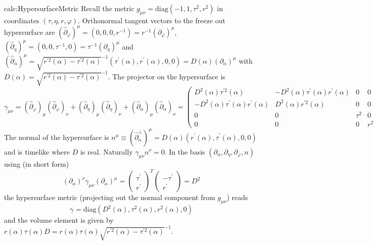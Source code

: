 \begin{calc}{calc:HypersurfaceMetric}
    Recall the metric $g_{\mu\nu}=\text{diag}(-1,1,\tau^2,r^2)$ in coordinates $(\tau,\eta,r,\varphi)$. Orthonormal tangent vectors to the freeze out hypersurface are $(\hat\partial_\varphi)^\mu=(0,0,0,r^{-1})=r^{-1}(\partial_\varphi)^\mu$, $(\hat\partial_\eta)^\mu=(0,0,\tau^{-1},0)=\tau^{-1}(\partial_\eta)^\mu$ and $(\hat\partial_\alpha)^\mu=\sqrt{r^{\prime 2}(\alpha)-\tau^{\prime 2}(\alpha)}^{-1}(\tau^{\prime}(\alpha),r^{\prime}(\alpha),0,0)=D(\alpha)(\partial_\alpha)^\mu$ with $D(\alpha)=\sqrt{r^{\prime 2}(\alpha)-\tau^{\prime 2}(\alpha)}^{-1}$. The projector on the hypersurface is
    \begin{equation}
        \gamma_{\mu\nu}=(\hat\partial_\varphi)_\mu(\hat\partial_\varphi)_\nu+(\hat\partial_\eta)_\mu(\hat\partial_\eta)_\nu+(\hat\partial_\alpha)_\mu(\hat\partial_\alpha)_\nu=\begin{pmatrix}
            D^2(\alpha)\tau^{\prime2}(\alpha)               & -D^2(\alpha)\tau^\prime(\alpha)r^\prime(\alpha) & 0      & 0   \\
            -D^2(\alpha)\tau^\prime(\alpha)r^\prime(\alpha) & D^2(\alpha)r^{\prime2}(\alpha)                  & 0      & 0   \\
            0                                               & 0                                               & \tau^2 & 0   \\
            0                                               & 0                                               & 0      & r^2
        \end{pmatrix}
    \end{equation}
    The normal of the hypersurface is $n^\mu\equiv(\hat\partial_\alpha^\perp)^\mu=D(\alpha)(r^\prime(\alpha),\tau^\prime(\alpha),0,0)$ and is timelike where $D$ is real. Naturally $\gamma_{\mu\nu}n^\nu=0$. In the basis $(\partial_\alpha,\partial_\eta,\partial_\varphi,n)$ using (in short form)
    \begin{equation}
        (\partial_\alpha)^\nu\gamma_{\mu\nu}(\partial_\alpha)^\mu=\begin{pmatrix}
            \tau^\prime \\r^\prime
        \end{pmatrix}^T\begin{pmatrix}
            -\tau^\prime \\
            r^\prime
        \end{pmatrix}=D^2
    \end{equation}
    the hypersurface metric (projecting out the normal component from $g_{\mu\nu}$) reads
    \begin{equation}
        \gamma_{}=\text{diag}(D^2(\alpha),\tau^2(\alpha),r^2(\alpha),0)
    \end{equation}
    and the volume element is given by $r(\alpha)\tau(\alpha) D=r(\alpha)\tau(\alpha)\sqrt{r^{\prime 2}(\alpha)-\tau^{\prime 2}(\alpha)}^{-1}$.
\end{calc}

